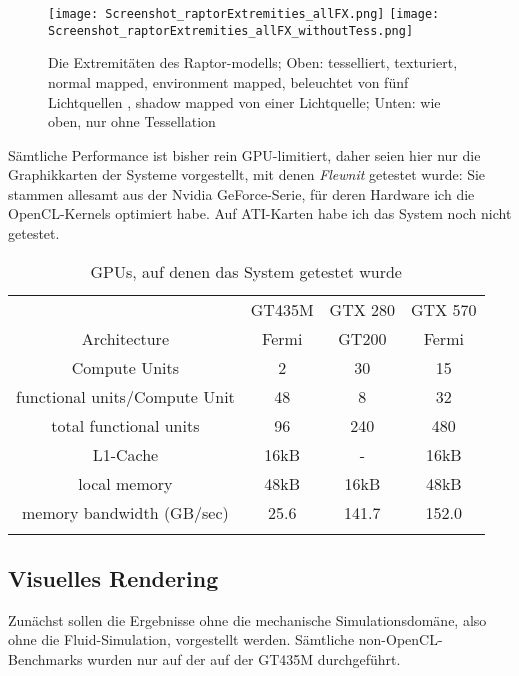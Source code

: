 
\label{sec:ergebnisse}

\begin{figure}[!h]

	\texttt{[image: Screenshot\_raptorExtremities\_allFX.png]} 
	\texttt{[image: Screenshot\_raptorExtremities\_allFX\_withoutTess.png]}

	\caption{Die Extremitäten des Raptor-modells; Oben: tesselliert, texturiert, normal mapped, environment mapped, 
	beleuchtet von fünf Lichtquellen , shadow mapped von einer Lichtquelle; Unten: wie oben, nur ohne Tessellation
	}
	\label{fig:raptorExtremitiesTessVSNonTess}
\end{figure}

Sämtliche Performance ist bisher rein GPU-limitiert, daher seien hier nur die
Graphikkarten der Systeme vorgestellt, mit denen \emph{Flewnit} getestet wurde: Sie stammen allesamt aus der 
Nvidia GeForce-Serie, für deren Hardware ich die OpenCL-Kernels optimiert habe. Auf ATI-Karten habe ich das
System noch nicht getestet.

\begin{table}[ht]
\begin{tabular}{|c|c|c|c|}
	\noalign{\hrule}
	& GT435M  & GTX 280 & GTX 570 \\
	\noalign{\hrule}
	Architecture &	Fermi & GT200 & Fermi \\
	\noalign{\hrule}
	Compute Units & 2 & 30 & 15 \\
	\noalign{\hrule}
	functional units/Compute Unit & 48 & 8 & 32 \\
	\noalign{\hrule}
	total functional units & 96 & 240 & 480 \\
	\noalign{\hrule}
	L1-Cache & 16kB & -	& 16kB	\\
	\noalign{\hrule}
	local memory & 48kB & 16kB & 48kB \\
	\noalign{\hrule}
	memory bandwidth (GB/sec) & 25.6 &  141.7 & 152.0 \\
	\noalign{\hrule}
\end{tabular}
\caption{GPUs, auf denen das System getestet wurde}
\label{tab:GPUs}
\end{table}



\subsection{Visuelles Rendering}


	Zunächst sollen die Ergebnisse ohne die mechanische Simulationsdomäne, also ohne die Fluid-Simulation,
	vorgestellt werden.
	Sämtliche non-OpenCL- Benchmarks wurden nur auf der auf der GT435M durchgeführt.
	
